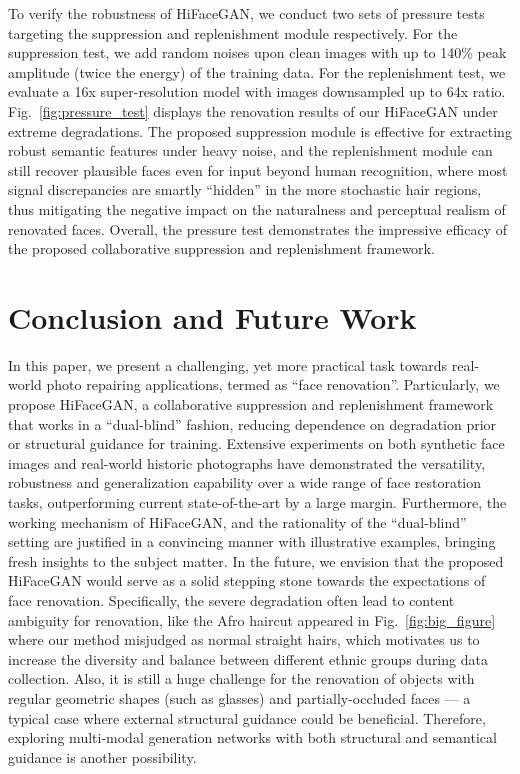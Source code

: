 \documentclass[sigconf]{acmart}
\begin{document}
To verify the robustness of HiFaceGAN, we conduct two sets of pressure tests targeting the suppression and replenishment module respectively. For the suppression test, we add random noises upon clean images with up to 140\% peak amplitude (twice the energy) of the training data. For the replenishment test, we evaluate a 16x super-resolution model with images downsampled up to 64x ratio. Fig.~\ref{fig:pressure_test} displays the renovation results of our HiFaceGAN under extreme degradations. The proposed suppression module is effective for extracting robust semantic features under heavy noise, and the replenishment module can still recover plausible faces even for input beyond human recognition, where most signal discrepancies are smartly ``hidden'' in the more stochastic hair regions, thus mitigating the negative impact on the naturalness and perceptual realism of renovated faces. Overall, the pressure test demonstrates the impressive efficacy of the proposed collaborative suppression and replenishment framework.
\fi

\section{Conclusion and Future Work}
In this paper, we present a challenging, yet more practical task towards real-world photo repairing applications, termed as ``face renovation''. Particularly, we propose HiFaceGAN, a collaborative suppression and replenishment framework that works in a ``dual-blind'' fashion, reducing dependence on degradation prior or structural guidance for training. Extensive experiments on both synthetic face images and real-world historic photographs have demonstrated the versatility, robustness and generalization capability over a wide range of face restoration tasks, outperforming current state-of-the-art by a large margin. Furthermore, the working mechanism of HiFaceGAN, and the rationality of the ``dual-blind'' setting are justified in a convincing manner with illustrative examples, bringing fresh insights to the subject matter. 
In the future, we envision that the proposed HiFaceGAN would serve as a solid stepping stone towards the expectations of face renovation. Specifically, the severe degradation often lead to content ambiguity for renovation, like the Afro haircut appeared in Fig.~\ref{fig:big_figure} where our method misjudged as normal straight hairs, which motivates us to increase the diversity and balance between different ethnic groups during data collection. Also, it is still a huge challenge for the renovation of objects with regular geometric shapes (such as glasses) and partially-occluded faces --- a typical case where external structural guidance could be beneficial. Therefore, exploring multi-modal generation networks with both structural and semantical guidance is another possibility.
\end{document}
